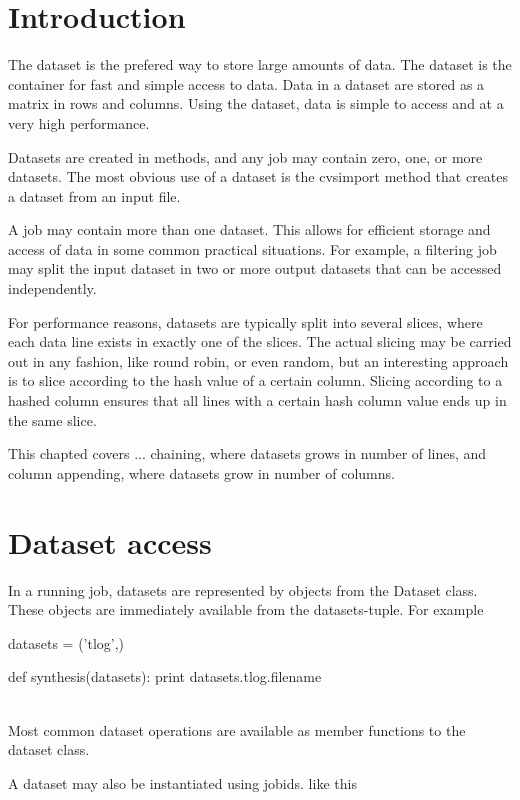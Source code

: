 \section{Introduction}

The dataset is the prefered way to store large amounts of data.  The
dataset is the container for fast and simple access to data.  Data in
a dataset are stored as a matrix in rows and columns.  Using the
dataset, data is simple to access and at a very high performance.

Datasets are created in methods, and any job may contain zero, one, or
more datasets.  The most obvious use of a dataset is the cvsimport
method that creates a dataset from an input file.

A job may contain more than one dataset.  This allows for efficient
storage and access of data in some common practical situations.  For
example, a filtering job may split the input dataset in two or more
output datasets that can be accessed independently.

For performance reasons, datasets are typically split into several
slices, where each data line exists in exactly one of the slices.  The
actual slicing may be carried out in any fashion, like round robin, or
even random, but an interesting approach is to slice according to the
hash value of a certain column.  Slicing according to a hashed column
ensures that all lines with a certain hash column value ends up in the
same slice.

This chapted covers ...
chaining, where datasets grows in number of lines, and column
appending, where datasets grow in number of columns.



\newpage
\section{Dataset access}

In a running job, datasets are represented by objects from the Dataset
class.  These objects are immediately available from the
datasets-tuple.  For example

\begin{python}
datasets = ('tlog',)

def synthesis(datasets):
  print datasets.tlog.filename
\end{python}
\\
Most common dataset operations are available as member functions
to the dataset class.

A dataset may also be instantiated using jobids. like this

